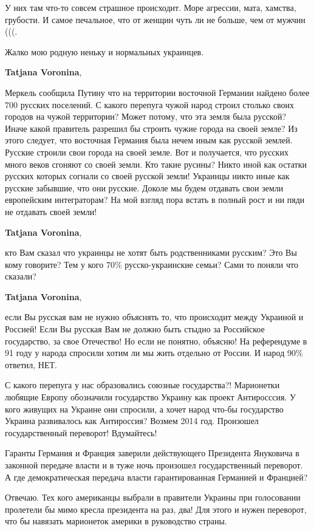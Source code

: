 \begin{itemize}
\begin{itemize}
У них там что-то совсем страшное происходит. Море агрессии, мата, хамства,
грубости. И самое печальное, что от женщин чуть ли не больше, чем от мужчин
(((.

Жалко мою родную неньку и нормальных украинцев.

\textbf{Tatjana Voronina}, 

Меркель сообщила Путину что на территории восточной Германии найдено более 700
русских поселений. С какого перепуга чужой народ строил столько своих городов
на чужой территории? Может потому, что эта земля была русской? Иначе какой
правитель разрешил бы строить чужие города на своей земле? Из этого следует,
что восточная Германия была нечем иным как русской землей. Русские строили свои
города на своей земле. Вот и получается, что русских много веков сгоняют со
своей земли. Кто такие русины? Никто иной как остатки русских которых согнали
со своей русской земли! Украинцы никто иные как русские забывшие, что они
русские. Доколе мы будем отдавать свои земли европейским интеграторам? На мой
взгляд пора встать в полный рост и ни пяди не отдавать своей земли!

\textbf{Tatjana Voronina}, 

кто Вам сказал что украинцы не хотят быть родственниками русским? Это Вы кому
говорите? Тем у кого 70\% русско-украинские семьи? Сами то поняли что сказали?

\textbf{Tatjana Voronina},

если Вы русская вам не нужно объяснять то, что происходит между Украиной и
Россией! Если Вы русская Вам не должно быть стыдно за Российское государство,
за свое Отечество! Но если не понятно, объясню! На референдуме в 91 году у
народа спросили хотим ли мы жить отдельно от России. И народ 90\% ответил, НЕТ.

С какого перепуга у нас образовались союзные государства?! Марионетки любящие
Европу обозначили государство Украину как проект Антиросссия. У кого живущих на
Украине они спросили, а хочет народ что-бы государство Украина развивалось как
Антироссия? Возмем 2014 год. Произошел государственный переворот! Вдумайтесь!

Гаранты Германия и Франция заверили действующего Президента Януковича в
законной передаче власти и в туже ночь произошел государственный переворот. А
где демократическая передача власти гарантированная Германией и Францией?

Отвечаю. Тех кого американцы выбрали в правители Украины при голосовании
пролетели бы мимо кресла президента на раз, два! Для этого и нужен переворот,
что бы навязать марионеток америки в руководство страны. 


\end{itemize}
\end{itemize}
